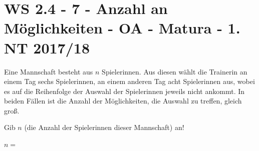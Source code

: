 \section{WS 2.4 - 7 - Anzahl an Möglichkeiten - OA - Matura - 1. NT 2017/18}

\begin{beispiel}[WS 2.4]{1}
Eine Mannschaft besteht aus $n$ Spielerinnen. Aus diesen wählt die Trainerin an einem Tag sechs Spielerinnen, an einem anderen Tag acht Spielerinnen aus, wobei es auf die Reihenfolge der Auswahl der Spielerinnen jeweils nicht ankommt. In beiden Fällen ist die Anzahl der Möglichkeiten, die Auswahl zu treffen, gleich groß.

Gib $n$ (die Anzahl der Spielerinnen dieser Mannschaft) an!\leer

$n=$\,
\end{beispiel}